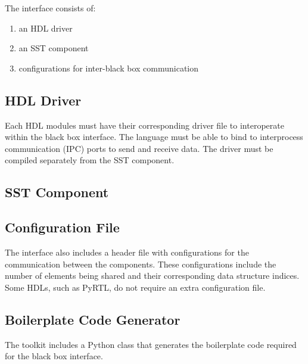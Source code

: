 \documentclass{article}
\begin{document}
  The interface consists of:
  \begin{enumerate}
    \item an HDL driver
    \item an SST component
    \item configurations for inter-black box communication
  \end{enumerate}

    \subsection{HDL Driver}
    Each HDL modules must have their corresponding driver file to interoperate within the black box
    interface. The language must be able to bind to interprocess communication (IPC) ports to send
    and receive data. The driver must be compiled separately from the SST component.

    \subsection{SST Component}
    

    \subsection{Configuration File}
    The interface also includes a header file with configurations for the communication between the
    components. These configurations include the number of elements being shared and their
    corresponding data structure indices. Some HDLs, such as PyRTL, do not require an extra
    configuration file.

    \subsection{Boilerplate Code Generator}
    The toolkit includes a Python class that generates the boilerplate code required for the black
    box interface.
\end{document}

